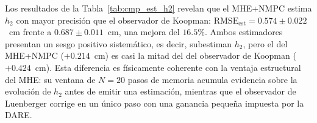 \documentclass[12pt,letterpaper]{article}
\begin{document}
\begin{table}[H]
\centering
\caption{Comparación directa de estimación de $h_2$ frente
a verdad-terreno (sensor físico en tanque~2). $\mathrm{RMSE}_{\mathrm{est}}$:
error cuadrático medio de $h_2^{\mathrm{real}}-\hat{h}_2$ en
régimen permanente. $\mathrm{Bias}_{\mathrm{est}}$: valor
medio del mismo error (positivo = subestimación de $h_2$).
Todas las métricas en cm.}
\label{tab:cmp_est_h2}
\end{table}

Los resultados de la Tabla~\ref{tab:cmp_est_h2} revelan que
el MHE+NMPC estima $h_2$ con mayor precisión que el
observador de Koopman: $\mathrm{RMSE}_{\mathrm{est}} =
0.574\pm0.022$~cm frente a $0.687\pm0.011$~cm, una mejora
del $16.5\%$. Ambos estimadores presentan un sesgo positivo
sistemático, es decir, subestiman $h_2$, pero el del MHE+NMPC
($+0.214$~cm) es casi la mitad del del observador de
Koopman ($+0.424$~cm). Esta diferencia es físicamente
coherente con la ventaja estructural del MHE: su ventana de
$N = 20$ pasos de memoria acumula evidencia sobre la
evolución de $h_2$ antes de emitir una estimación, mientras
que el observador de Luenberger corrige en un único paso con
una ganancia pequeña impuesta por la DARE.
\end{document}
